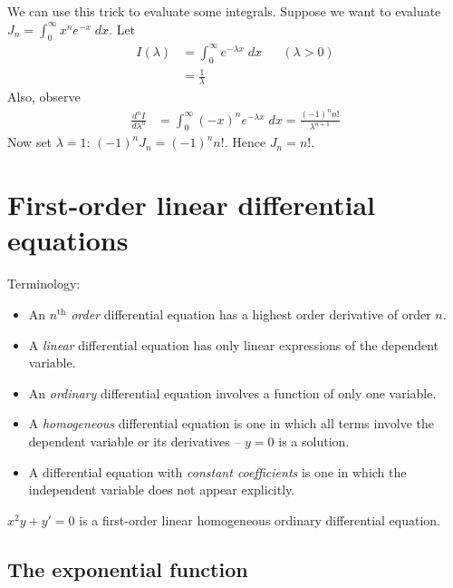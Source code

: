 \documentclass{../template/note}
\begin{document}
    \begin{example}
        We can use this trick to evaluate some integrals. Suppose we want to evaluate \(J_n = \int_0^\infty x^n e^{-x} \; dx\). Let
        \begin{align*}
            I(\lambda) &= \int_0^\infty e^{-\lambda x} \; dx && (\lambda > 0) \\
            &= \frac{1}{\lambda}
        \end{align*}
        Also, observe
        \begin{align*}
            \frac{d^nI}{d\lambda^n} &= \int_0^\infty (-x)^n e^{-\lambda x} \; dx = \frac{(-1)^n n!}{\lambda^{n+1}}
        \end{align*}
        Now set \(\lambda = 1\): \((-1)^n J_n = (-1)^n n!\). Hence \(J_n = n!\).
    \end{example}
    

    \section{First-order linear differential equations}

    Terminology:
    \begin{itemize}
        \item An \emph{\(n^\text{th}\) order} differential equation has a highest order derivative of order \(n\).
        \item A \emph{linear} differential equation has only linear expressions of the dependent variable.
        \item An \emph{ordinary} differential equation involves a function of only one variable.
        \item A \emph{homogeneous} differential equation is one in which all terms involve the dependent variable or its derivatives -- \(y=0\) is a solution.
        \item A differential equation with \emph{constant coefficients} is one in which the independent variable does not appear explicitly.
    \end{itemize}
    
    \begin{example}
        \(x^2y+y'=0\) is a first-order linear homogeneous ordinary differential equation.
    \end{example}
    
    \subsection{The exponential function}
\end{document}
